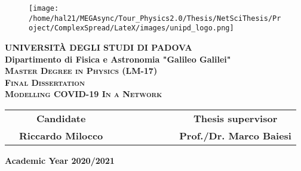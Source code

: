 \documentclass[a4paper,10pt, oneside]{book} %
\theoremstyle{definition}
\begin{document}
\frontmatter


\begin{titlepage}
\vspace{5mm}
\begin{figure}[hbtp]
\centering
\texttt{[image: /home/hal21/MEGAsync/Tour\_Physics2.0/Thesis/NetSciThesis/Project/ComplexSpread/LateX/images/unipd\_logo.png]}
\end{figure}
\vspace{5mm}
\begin{center}
{{\huge{\textbf{\LARGE UNIVERSIT\`A DEGLI STUDI DI PADOVA}}}\\}
\vspace{20mm}
{\Large{\bf Dipartimento di Fisica e Astronomia "Galileo Galilei"}} \\
\vspace{5mm}
{\Large{\textsc{\bf Master Degree in Physics (LM-17)}}}\\  
\vspace{20mm}
{\Large{\textsc{\bf Final Dissertation}}}\\
\vspace{30mm}
{\Large{\textsc{\bf Modelling COVID-19 In a Network}}}\\
\vspace{45mm}
\end{center}

\begin{spacing}{2}
\begin{tabular}{cccccccccc}
	& {\Large{\bf Candidate}} &&&&&&&& {\Large{\bf Thesis supervisor}}\\
	& {\Large{\bf Riccardo Milocco}} &&&&&&&& {\Large{\bf Prof./Dr. Marco Baiesi}}\\
\end{tabular}
\end{spacing}
\vspace{15 mm}

\begin{center}
{\Large{\bf Academic Year 2020/2021}}
\end{center}
\end{titlepage}

\restoregeometry

\clearpage{\pagestyle{empty}\cleardoublepage}

\pagestyle{empty}

\vspace*{\fill}
\tableofcontents
\vspace*{\fill}
\end{document}
